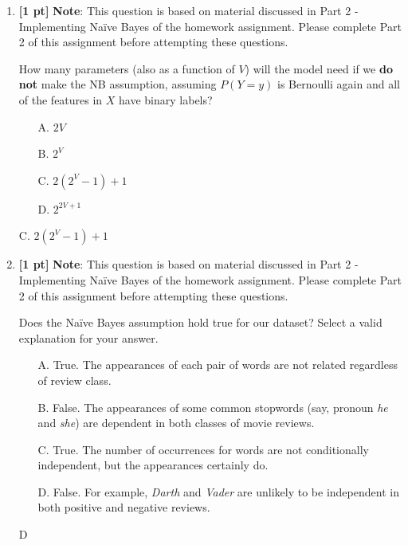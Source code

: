 \documentclass{article}
\begin{document}
\begin{enumerate}
    \item \textbf{[1 pt]} \textbf{Note}: This question is based on material discussed in Part 2 - Implementing Na{\"i}ve Bayes of the homework assignment. Please complete Part 2 of this assignment before attempting these questions.
    
    How many parameters (also as a function of $V$) will the model need if we \textbf{do not} make the NB assumption, assuming $P(Y=y)$ is Bernoulli again and all of the features in $X$ have binary labels?
    \begin{itemize}
        \item[A.] $2V$
        \item[B.] $2^V$
        \item[C.] $2(2^V-1)+1$
        \item[D.] $2^{2V+1}$
    \end{itemize}
    \begin{tcolorbox}[width=\linewidth/3,height=1.5cm]
    C. $2(2^V-1)+1$
    \end{tcolorbox}
    \newpage
    
    \item \textbf{[1 pt]} \textbf{Note}: This question is based on material discussed in Part 2 - Implementing Na{\"i}ve Bayes of the homework assignment. Please complete Part 2 of this assignment before attempting these questions.
    
    Does the Na{\"i}ve Bayes assumption hold true for our dataset? Select a valid explanation for your answer.
    \begin{itemize}
        \item[A.] True. The appearances of each pair of words are not related regardless of review class.
        \item[B.] False. The appearances of some common stopwords (say, pronoun \textit{he} and \textit{she}) are dependent in both classes of movie reviews.
        \item[C.] True. The number of occurrences for words are not conditionally independent, but the appearances certainly do.
        \item[D.] False. For example, \textit{Darth} and \textit{Vader} are unlikely to be independent in both positive and negative reviews.
    \end{itemize}
    \begin{tcolorbox}[width=\linewidth/3,height=1.5cm]
    D
    \end{tcolorbox}


\end{enumerate}
\end{document}
